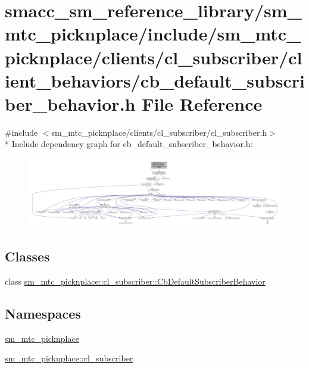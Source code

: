 \hypertarget{sm__mtc__picknplace_2include_2sm__mtc__picknplace_2clients_2cl__subscriber_2client__behaviors_2caf59528891fccb37b58cb3e15377c0e5}{}\section{smacc\+\_\+sm\+\_\+reference\+\_\+library/sm\+\_\+mtc\+\_\+picknplace/include/sm\+\_\+mtc\+\_\+picknplace/clients/cl\+\_\+subscriber/client\+\_\+behaviors/cb\+\_\+default\+\_\+subscriber\+\_\+behavior.h File Reference}
\label{sm__mtc__picknplace_2include_2sm__mtc__picknplace_2clients_2cl__subscriber_2client__behaviors_2caf59528891fccb37b58cb3e15377c0e5}
{\ttfamily \#include $<$sm\+\_\+mtc\+\_\+picknplace/clients/cl\+\_\+subscriber/cl\+\_\+subscriber.\+h$>$}\\*
Include dependency graph for cb\+\_\+default\+\_\+subscriber\+\_\+behavior.\+h\+:
\nopagebreak
\begin{figure}[H]
\begin{center}
\leavevmode
\includegraphics[width=350pt]{sm__mtc__picknplace_2include_2sm__mtc__picknplace_2clients_2cl__subscriber_2client__behaviors_2c410bd935052ca17ecbda3b06fe040b7f}
\end{center}
\end{figure}
\subsection*{Classes}
\begin{DoxyCompactItemize}
\item 
class \hyperlink{classsm__mtc__picknplace_1_1cl__subscriber_1_1CbDefaultSubscriberBehavior}{sm\+\_\+mtc\+\_\+picknplace\+::cl\+\_\+subscriber\+::\+Cb\+Default\+Subscriber\+Behavior}
\end{DoxyCompactItemize}
\subsection*{Namespaces}
\begin{DoxyCompactItemize}
\item 
 \hyperlink{namespacesm__mtc__picknplace}{sm\+\_\+mtc\+\_\+picknplace}
\item 
 \hyperlink{namespacesm__mtc__picknplace_1_1cl__subscriber}{sm\+\_\+mtc\+\_\+picknplace\+::cl\+\_\+subscriber}
\end{DoxyCompactItemize}
